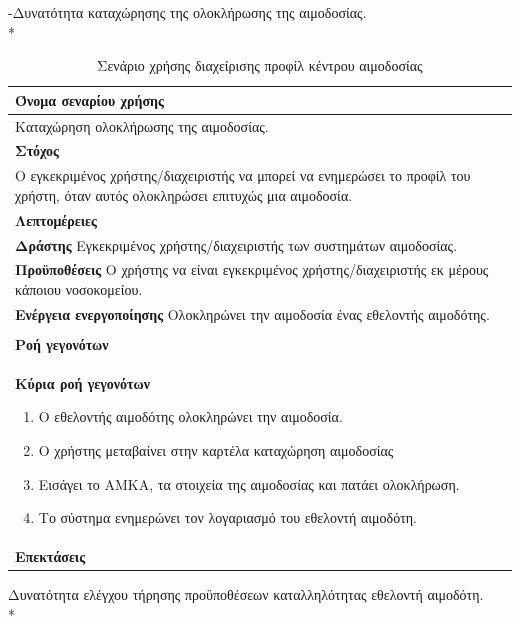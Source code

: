 -Δυνατότητα καταχώρησης της ολοκλήρωσης της αιμοδοσίας.
\\*	

\begin{table}[H]
	\begin{center}
	    \begin{tabular}{|p{\dimexpr \linewidth-2\tabcolsep}|}
	    \hline
	    \rowcolor{grayy}
	    \textbf{Όνομα σεναρίου χρήσης}
	    \\ \hline    
	    Καταχώρηση ολοκλήρωσης της αιμοδοσίας.
	     \\ \hline
	    \rowcolor{grayy}
	    \textbf{\textbf{Στόχος}}
	    \\ \hline
	 	 Ο εγκεκριμένος χρήστης/διαχειριστής να μπορεί να ενημερώσει το προφίλ του χρήστη, όταν αυτός ολοκληρώσει επιτυχώς μια αιμοδοσία.
	    \\ \hline
	    \rowcolor{grayy}
	    \textbf{Λεπτομέρειες}
	    \\ \hline
		\textbf{Δράστης} Εγκεκριμένος χρήστης/διαχειριστής των συστημάτων αιμοδοσίας.
		\\*
		\textbf{Προϋποθέσεις} Ο χρήστης να είναι εγκεκριμένος χρήστης/διαχειριστής εκ μέρους κάποιου νοσοκομείου.
		\\*
		\textbf{Ενέργεια ενεργοποίησης} Ολοκληρώνει την αιμοδοσία ένας εθελοντής αιμοδότης.
		\\ \hline
	    \\ \hline
		\rowcolor{grayy}    
	    \textbf{Ροή γεγονότων}
	    \\* 
		\textbf{Κύρια ροή γεγονότων}
		\begin{enumerate}
			\item	 Ο εθελοντής αιμοδότης ολοκληρώνει την αιμοδοσία.
			\item Ο χρήστης μεταβαίνει στην καρτέλα καταχώρηση αιμοδοσίας
			\item Εισάγει το ΑΜΚΑ, τα στοιχεία της αιμοδοσίας και πατάει ολοκλήρωση.
			\item Το σύστημα ενημερώνει τον λογαριασμό του εθελοντή αιμοδότη.
		\end{enumerate}
		\\*
		\textbf{Επεκτάσεις}
		   \\ \hline
	    \end{tabular}
	    \caption{Σενάριο χρήσης διαχείρισης προφίλ κέντρου αιμοδοσίας}
	    \label{tab:add_completed_blood_donation}
	\end{center}
\end{table}	


Δυνατότητα ελέγχου τήρησης προϋποθέσεων καταλληλότητας εθελοντή αιμοδότη.
\\*


